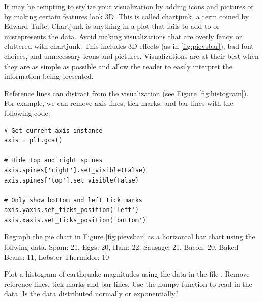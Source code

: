 It may be tempting to stylize your visualization by adding icons and pictures or by making certain features
look 3D.  This is called chartjunk, a term coined by Edward Tufte. Chartjunk is anything in a plot that fails to add to or
misrepresents the data.  Avoid making visualizations that are overly fancy or cluttered with chartjunk. This
includes 3D effects (as in \ref{fig:pievsbar}), bad font choices, and unnecessary icons and pictures.
Visualizations are at their best when they are as simple as possible and allow the reader to easily
interpret the information being presented.

Reference lines can distract from the visualization (see Figure \ref{fig:histogram}).
For example, we can remove axis lines, tick marks, and bar lines
with the following code:

\begin{lstlisting}
# Get current axis instance
axis = plt.gca()

# Hide top and right spines
axis.spines['right'].set_visible(False)
axis.spines['top'].set_visible(False)

# Only show bottom and left tick marks
axis.yaxis.set_ticks_position('left')
axis.xaxis.set_ticks_position('bottom')
\end{lstlisting}

\begin{problem} %
Regraph the pie chart in Figure \ref{fig:pievsbar} as a horizontal bar chart using the follwing data.
Spam: 21, Eggs: 20, Ham: 22, Sausage: 21, Bacon: 20, Baked Beans: 11, Lobster Thermidor: 10
\end{problem}

\begin{problem} %
Plot a histogram of earthquake magnitudes using the data in the file . 
Remove reference lines, tick marks and bar lines.
Use the numpy function  to read in the data.
Is the data distributed normally or exponentially?
\end{problem}

